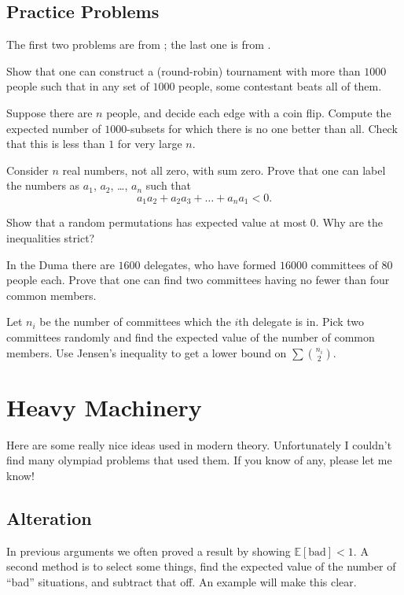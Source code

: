 \documentclass[11pt]{scrartcl}
\newcommand\EE{\mathbb E}
\begin{document}
\subsection{Practice Problems}
The first two problems are from \cite{ravi}; the last one is from \cite{poshen}.
\begin{problem}
  Show that one can construct a (round-robin) tournament with more than $1000$ people
  such that in any set of $1000$ people, some contestant beats all of them.
  \begin{sketch}
    Suppose there are $n$ people, and decide each edge with a coin flip.
    Compute the expected number of $1000$-subsets for which there is no one better than all.
    Check that this is less than $1$ for very large $n$.
  \end{sketch}
\end{problem}
\begin{problem}
  [BAMO 2004] Consider $n$ real numbers, not all zero, with sum zero.
  Prove that one can label the numbers as $a_1$, $a_2$, \dots, $a_n$ such that
  \[ a_1 a_2 + a_2 a_3 + \dots + a_n a_1 < 0. \]
  \begin{sketch}
    Show that a random permutations has expected value at most $0$.
    Why are the inequalities strict?
  \end{sketch}
\end{problem}
\begin{problem}
  [Russia 1996] In the Duma there are $1600$ delegates,
  who have formed $16000$ committees of $80$ people each.
  Prove that one can find two committees having no fewer than four common members.
  \begin{sketch}
    Let $n_i$ be the number of committees which the $i$th delegate is in.
    Pick two committees randomly and find the expected value of the number of common members.
    Use Jensen's inequality to get a lower bound on $\sum \binom{n_i}{2}$.
  \end{sketch}
\end{problem}




\section{Heavy Machinery}
Here are some really nice ideas used in modern theory.
Unfortunately I couldn't find many olympiad problems that used them.
If you know of any, please let me know!

\subsection{Alteration}
In previous arguments we often proved a result by showing $\EE[\text{bad}] < 1$.
A second method is to select some things,
find the expected value of the number of ``bad'' situations,
and subtract that off.
An example will make this clear.
\end{document}

